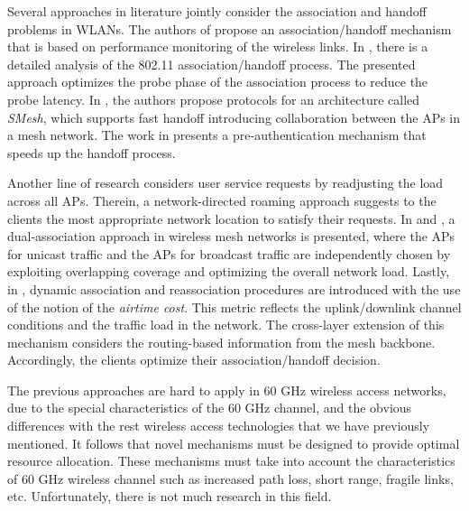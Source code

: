 \documentclass[journal, 10pt, twocolumn]{IEEEtran}
\begin{document}
Several approaches in literature jointly consider the association and handoff problems in WLANs. The authors of \cite{Mhatre} propose an association/handoff mechanism that is based on performance monitoring of the wireless links. In \cite{Arbaugh}, there is a detailed analysis of the 802.11 association/handoff process. The presented approach optimizes the probe phase of the association process to reduce the probe latency. In \cite{Amir06}, the authors propose protocols for an architecture called \emph{SMesh}, which supports fast handoff introducing collaboration between the APs in a mesh network. The work in \cite{Park07} presents a pre-authentication mechanism that speeds up the handoff process.

Another line of research considers user service requests by readjusting the load across all APs\cite{Balachandran02}. Therein, a network-directed roaming approach suggests to the clients the most appropriate network location to satisfy their requests. In \cite{Lee07} and \cite{Lee05}, a dual-association approach in wireless mesh networks is presented, where the APs for unicast traffic and the APs for broadcast traffic are independently chosen by exploiting overlapping coverage and optimizing the overall network load. Lastly, in \cite{Athanasiou07}, \cite{Athanasiou09} dynamic association and reassociation procedures are introduced with the use of the notion of the \emph{airtime cost}. This metric reflects the uplink/downlink channel conditions and the traffic load in the network. The cross-layer extension of this mechanism considers the routing-based information from the mesh backbone. Accordingly, the clients optimize their association/handoff decision.

The previous approaches are hard to apply in 60 GHz wireless access networks, due to the special characteristics of the 60 GHz channel, and the obvious differences with the rest wireless access technologies that we have previously mentioned. It follows that novel mechanisms must be designed to provide optimal resource allocation. These mechanisms must take into account the characteristics of 60 GHz wireless channel such as increased path loss, short range, fragile links, etc. Unfortunately, there is not much research in this field.
\end{document}
